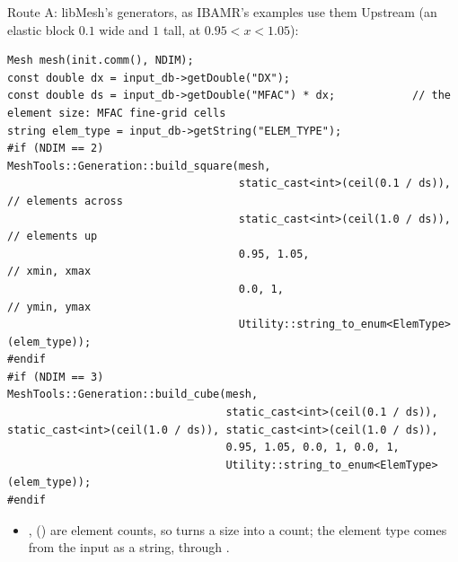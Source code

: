 \documentclass[aspectratio=169,11pt]{beamer}
\begin{document}
\begin{frame}[fragile]{Route A: libMesh's generators, as IBAMR's examples use them}
\label{fr:generators}
\footnotesize
Upstream  (an elastic block $0.1$ wide and $1$ tall, at $0.95 < x < 1.05$):
\begin{lstlisting}[style=cpptiny]
Mesh mesh(init.comm(), NDIM);
const double dx = input_db->getDouble("DX");
const double ds = input_db->getDouble("MFAC") * dx;            // the element size: MFAC fine-grid cells
string elem_type = input_db->getString("ELEM_TYPE");
#if (NDIM == 2)
MeshTools::Generation::build_square(mesh,
                                    static_cast<int>(ceil(0.1 / ds)),   // elements across
                                    static_cast<int>(ceil(1.0 / ds)),   // elements up
                                    0.95, 1.05,                         // xmin, xmax
                                    0.0, 1,                             // ymin, ymax
                                    Utility::string_to_enum<ElemType>(elem_type));
#endif
#if (NDIM == 3)
MeshTools::Generation::build_cube(mesh,
                                  static_cast<int>(ceil(0.1 / ds)), static_cast<int>(ceil(1.0 / ds)), static_cast<int>(ceil(1.0 / ds)),
                                  0.95, 1.05, 0.0, 1, 0.0, 1,
                                  Utility::string_to_enum<ElemType>(elem_type));
#endif
\end{lstlisting}
\begin{itemize}
  \item {},  () are element counts, so  turns a size into a count; the element type comes from the input as a string, through .
\end{itemize}
\end{frame}
\end{document}
